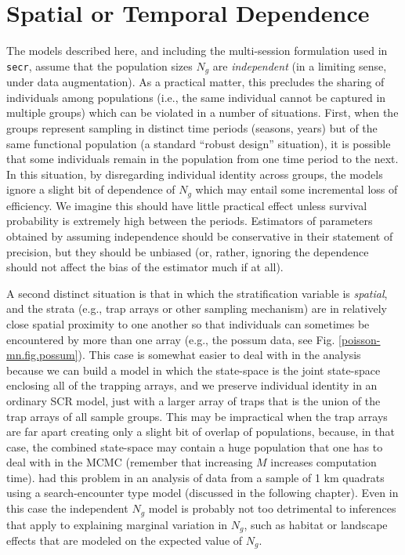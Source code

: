 \section{Spatial or Temporal Dependence}

The models described here, and including the multi-session formulation
used in \mbox{\tt secr}, assume that the population sizes $N_{g}$ are
{\it independent} (in a limiting sense, under data augmentation).  As
a practical matter, this precludes the sharing of individuals among
populations (i.e., the same individual cannot be captured in multiple
groups) which can be violated in a number of situations.  First, when
the groups represent sampling in distinct time periods (seasons,
years) but of the same functional population (a standard ``robust
design'' situation), it is possible that some individuals remain in
the population from one time period to the next.  In this situation,
by disregarding individual identity across groups, the models ignore a
slight bit of dependence of $N_{g}$ which may entail some incremental
loss of efficiency. We imagine this should have little practical
effect unless survival probability is extremely high between the
periods.  Estimators of parameters obtained by assuming independence
should be conservative in their statement of precision, but they
should be unbiased (or, rather, ignoring the dependence should not
affect the bias of the estimator much if at all).

A second distinct situation is that in which the stratification
variable is {\it spatial}, and the strata (e.g., trap arrays or other
sampling mechanism) are in relatively close spatial proximity to one
another so that individuals can sometimes be encountered by more than
one array (e.g., the possum data, see
Fig. \ref{poisson-mn.fig.possum}). This case is somewhat easier to
deal with in the analysis because we can build a model in which the
state-space is the joint state-space enclosing all of the trapping
arrays, and we preserve individual identity in an ordinary SCR model,
just with a larger array of traps that is the union of the trap arrays
of all sample groups. This may be impractical when the trap arrays are
far apart creating only a slight bit of overlap of populations,
because, in that case, the combined state-space may contain a huge
population that one has to deal with in the MCMC (remember that
increasing $M$ increases computation time).
\citep{royle_etal:2011mee} had this problem in an analysis of data
from a sample of 1 km quadrats using a search-encounter type model
(discussed in the following chapter).  Even in this case the
independent $N_{g}$ model is probably not too detrimental to
inferences that apply to explaining marginal variation in $N_{g}$,
such as habitat or landscape effects that are modeled on the expected
value of $N_{g}$.

